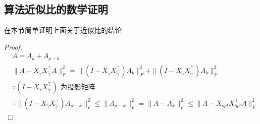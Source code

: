 \documentclass{ctexart}
\begin{document}
    \subsection{算法近似比的数学证明}
    在本节简单证明上面关于近似比的结论
    \begin{proof}
    \begin{align*}
    &  A = A_{k} + A_{\rho - k}\\
    &\| A - X_{\tilde{\gamma}}X_{\tilde{\gamma}}^{\top}A \|_{F}^2 =
     \| (I - X_{\tilde{\gamma}}X_{\tilde{\gamma}}^{\top})A_{k} \|_{F}^2
    + \| (I - X_{\tilde{\gamma}}X_{\tilde{\gamma}}^{\top}) A_{k} \|_{F}^2\\
    &\because
    (I - X_{\tilde{\gamma}}X_{\tilde{\gamma}}^{\top}) \text { 为投影矩阵 }\\
    & \therefore
    \|(I - X_{\tilde{\gamma}}X_{\tilde{\gamma}}^{\top})A_{\rho -k}\|_{F}^2
        \le \|A_{\rho - k}\|_{F}^2 = \|A - A_{k} \|_{F}^2 	
        \le \|A - X_{opt}X_{opt}^{\top}A\|_{F}^2
    \end{align*}


\end{proof}
\end{document}
